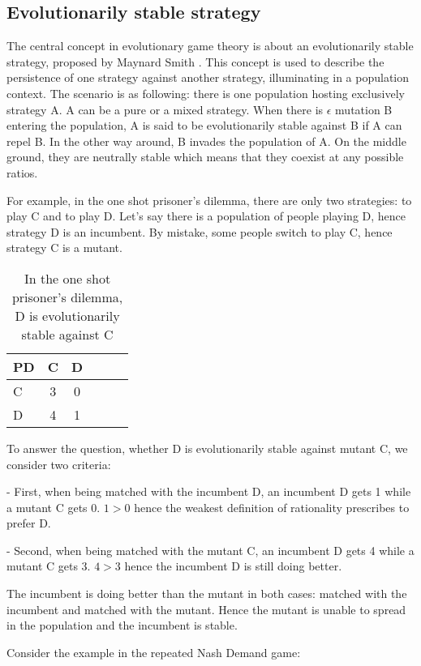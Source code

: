 \documentclass[12.5pt]{report}
\begin{document}
\subsection{Evolutionarily stable strategy}

The central concept in evolutionary game theory is about an evolutionarily stable strategy, proposed by Maynard Smith \cite{maynard}. This concept is used to describe the persistence of one strategy against another strategy, illuminating in a population context. The scenario is as following: there is one population hosting exclusively strategy A. A can be a pure or a mixed strategy. When there is $\epsilon$ mutation B entering the population, A is said to be evolutionarily stable against B if A can repel B. In the other way around, B invades the population of A. On the middle ground, they are neutrally stable which means that they coexist at any possible ratios.

For example, in the one shot prisoner's dilemma, there are only two strategies: to play C and to play D. Let's say there is a population of people playing D, hence strategy D is an incumbent. By mistake, some people switch to play C, hence strategy C is a mutant.

\begin{table}[h!]
\center
\begin{tabular}{l|ccccc}
\textbf{PD}& C & D \\
\hline
C & 3 &  0   \\
D &  4  & 1   \\
\end{tabular}
\caption{In the one shot prisoner's dilemma, D is evolutionarily stable against C}
\end{table}

To answer the question, whether D is evolutionarily stable against mutant C, we consider two criteria:

- First, when being matched with the incumbent D, an incumbent D gets 1 while a mutant C gets 0. $1 > 0$ hence the weakest definition of rationality prescribes to prefer D.

- Second, when being matched with the mutant C, an incumbent D gets 4 while a mutant C gets 3. $4 > 3$ hence the incumbent D is still doing better.

The incumbent is doing better than the mutant in both cases: matched with the incumbent and matched with the mutant. Hence the mutant is unable to spread in the population and the incumbent is stable.


Consider the example in the repeated Nash Demand game:
\end{document}
